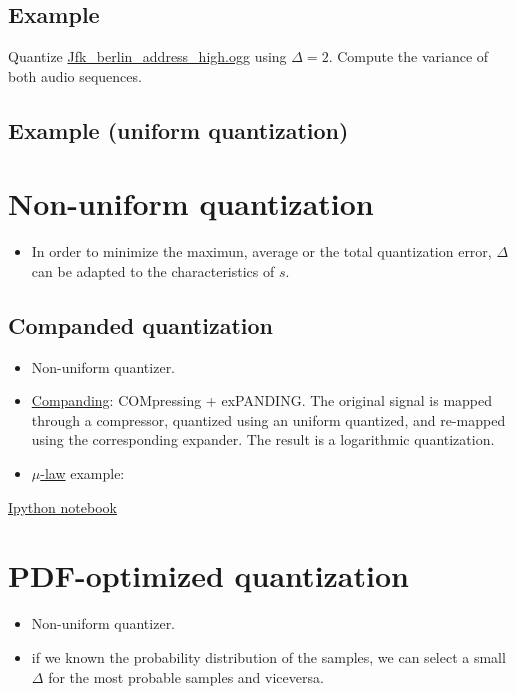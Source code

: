 \subsection{Example}
Quantize
\href{https://upload.wikimedia.org/wikipedia/commons/3/3a/Jfk_berlin_address_high.ogg}{Jfk\_berlin\_address\_high.ogg}
using \(\Delta=2\). Compute the variance of both audio sequences.

\subsection*{Example (uniform quantization)}


\section{Non-uniform quantization}
\begin{itemize}
  \tightlist
\item
  In order to minimize the maximun, average or the total quantization
  error, \(\Delta\) can be adapted to the characteristics of \(s\).
\end{itemize}

\subsection{Companded quantization}
\begin{itemize}
\item
  Non-uniform quantizer.
\item
  \href{https://en.wikipedia.org/wiki/Companding}{Companding}:
  COMpressing + exPANDING. The original signal is mapped through a
  compressor, quantized using an uniform quantized, and re-mapped using
  the corresponding expander. The result is a logarithmic quantization.
\item
  \href{https://en.wikipedia.org/wiki/\%CE\%9C-law_algorithm}{\(\mu\)-law}
  example:
\end{itemize}

\href{https://nbviewer.jupyter.org/github/vicente-gonzalez-ruiz/quantization/blob/master/companded_quantization.ipynb}{Ipython notebook}


\section{PDF-optimized quantization}
\begin{itemize}
\item
  Non-uniform quantizer.
\item
  if we known the probability distribution of the samples, we can select
  a small \(\Delta\) for the most probable samples and viceversa.
\end{itemize}

